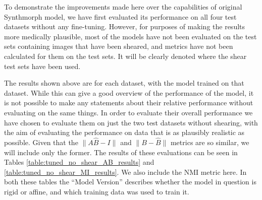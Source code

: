 To demonstrate the improvements made here over the capabilities of original Synthmorph model, we have first evaluated its performance on all four test datasets without any fine-tuning. However, for purposes of making the results more medically plausible, most of the models have not been evaluated on the test sets containing images that have been sheared, and metrics have not been calculated for them on the test sets. It will be clearly denoted where the shear test sets have been used.



The results shown above are for each dataset, with the model trained on that dataset. While this can give a good overview of the performance of the model, it is not possible to make any statements about their relative performance without evaluating on the same things. In order to evaluate their overall performance we have chosen to evaluate them on just the two test datasets without shearing, with the aim of evaluating the performance on data that is as plausibly realistic as possible. Given that the $\|A\hat{B} - I\|$ and $\|B - \hat{B}\|$ metrics are so similar, we will include only the former. The results of these evaluations can be seen in Tables \ref{table:tuned_no_shear_AB_results} and \ref{table:tuned_no_shear_MI_results}. We also include the NMI metric here. In both these tables the ``Model Version'' describes whether the model in question is rigid or affine, and which training data was used to train it.


